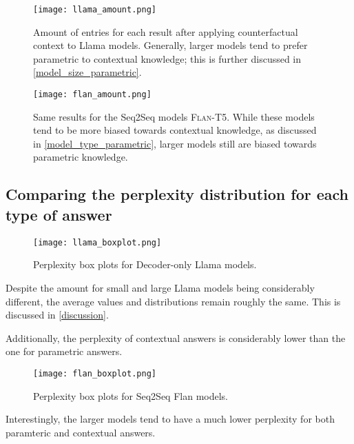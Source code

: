 \begin{figure}[h]
	\centering
	\texttt{[image: llama\_amount.png]}
	\caption{Amount of entries for each result after applying counterfactual context to Llama models. Generally, larger models tend to prefer parametric to contextual knowledge; this is further discussed in \cref{model_size_parametric}.}
\end{figure}

\begin{figure}[h]
	\centering
	\texttt{[image: flan\_amount.png]}
	\caption{Same results for the Seq2Seq models \textsc{Flan-T5}. While these models tend to be more biased towards contextual knowledge, as discussed in \cref{model_type_parametric}, larger models still are biased towards parametric knowledge.}
\end{figure}

\subsection{Comparing the perplexity distribution for each type of answer}
\begin{figure}[h]
	\centering
	\texttt{[image: llama\_boxplot.png]}
	\caption{Perplexity box plots for Decoder-only Llama models.}
\end{figure}

Despite the amount for small and large Llama models being considerably different, the average values and distributions remain roughly the same.
This is discussed in \cref{discussion}.

Additionally, the perplexity of contextual answers is considerably lower than the one for parametric answers.

\begin{figure}[h]
	\centering
	\texttt{[image: flan\_boxplot.png]}
	\caption{Perplexity box plots for Seq2Seq Flan models.}
\end{figure}

Interestingly, the larger models tend to have a much lower perplexity for both paramteric and contextual answers.

